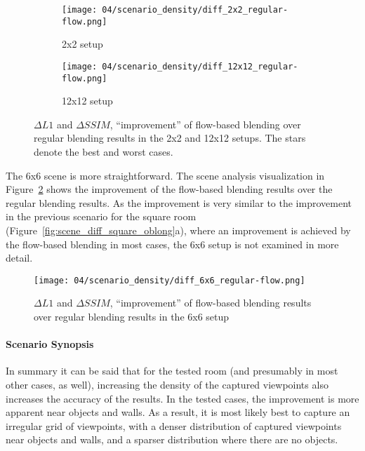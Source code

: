 \begin{figure}
\centering
    \hfill
    \begin{subfigure}[b]{0.4\textwidth}
            \centering
            \texttt{[image: 04/scenario\_density/diff\_2x2\_regular-flow.png]}
            \caption{2x2 setup}
    \end{subfigure}
    \hfill
    \begin{subfigure}[b]{0.4\textwidth}
            \centering
            \texttt{[image: 04/scenario\_density/diff\_12x12\_regular-flow.png]}
            \caption{12x12 setup}
    \end{subfigure}
    \hfill
  \caption[$\Delta L1$ and $\Delta SSIM$ in the 2x2 and 12x12 setups]{$\Delta L1$ and $\Delta SSIM$, ``improvement'' of flow-based blending over regular blending results in the 2x2 and 12x12 setups. The stars denote the best and worst cases.} \label{fig:dens_diff_2x2_12x12}
\end{figure}

The 6x6 scene is more straightforward. The scene analysis visualization in Figure~\ref{fig:dens_diff_6x6} shows the improvement of the flow-based blending results over the regular blending results. As the improvement is very similar to the improvement in the previous scenario for the square room (Figure~\ref{fig:scene_diff_square_oblong}a), where an improvement is achieved by the flow-based blending in most cases, the 6x6 setup is not examined in more detail.

\begin{figure}
		\centering
		\texttt{[image: 04/scenario\_density/diff\_6x6\_regular-flow.png]}
		\caption[$\Delta L1$ and $\Delta SSIM$ in the 6x6 setup]{$\Delta L1$ and $\Delta SSIM$, ``improvement'' of flow-based blending results over regular blending results in the 6x6 setup}
		\label{fig:dens_diff_6x6}
\end{figure}

\paragraph{Scenario Synopsis}
In summary it can be said that for the tested room (and presumably in most other cases, as well), increasing the density of the captured viewpoints also increases the accuracy of the results. In the tested cases, the improvement is more apparent near objects and walls. As a result, it is most likely best to capture an irregular grid of viewpoints, with a denser distribution of captured viewpoints near objects and walls, and a sparser distribution where there are no objects.

